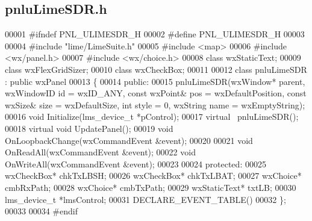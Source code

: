 \subsection{pnlu\+Lime\+S\+D\+R.\+h}
\label{pnluLimeSDR_8h_source}

\begin{DoxyCode}
00001 \textcolor{preprocessor}{#ifndef PNL\_ULIMESDR\_H}
00002 \textcolor{preprocessor}{#define PNL\_ULIMESDR\_H}
00003 
00004 \textcolor{preprocessor}{#include "lime/LimeSuite.h"}
00005 \textcolor{preprocessor}{#include <map>}
00006 \textcolor{preprocessor}{#include <wx/panel.h>}
00007 \textcolor{preprocessor}{#include <wx/choice.h>}
00008 \textcolor{keyword}{class }wxStaticText;
00009 \textcolor{keyword}{class }wxFlexGridSizer;
00010 \textcolor{keyword}{class }wxCheckBox;
00011 
00012 \textcolor{keyword}{class }pnluLimeSDR : \textcolor{keyword}{public} wxPanel
00013 \{
00014 \textcolor{keyword}{public}:
00015     pnluLimeSDR(wxWindow* parent, wxWindowID \textcolor{keywordtype}{id} = wxID\_ANY, \textcolor{keyword}{const} wxPoint& pos = wxDefaultPosition, \textcolor{keyword}{const} 
      wxSize& size = wxDefaultSize, \textcolor{keywordtype}{int} style = 0, wxString name = wxEmptyString);
00016     \textcolor{keywordtype}{void} Initialize(lms_device_t *pControl);
00017     \textcolor{keyword}{virtual} ~pnluLimeSDR();
00018     \textcolor{keyword}{virtual} \textcolor{keywordtype}{void} UpdatePanel();
00019     \textcolor{keywordtype}{void} OnLoopbackChange(wxCommandEvent &event);
00020 
00021     \textcolor{keywordtype}{void} OnReadAll(wxCommandEvent &event);
00022     \textcolor{keywordtype}{void} OnWriteAll(wxCommandEvent &event);
00023 
00024 \textcolor{keyword}{protected}:
00025     wxCheckBox* chkTxLBSH;
00026     wxCheckBox* chkTxLBAT;
00027     wxChoice* cmbRxPath;
00028     wxChoice* cmbTxPath;
00029     wxStaticText* txtLB;
00030     lms_device_t *lmsControl;
00031     DECLARE\_EVENT\_TABLE()
00032 \};
00033 
00034 \textcolor{preprocessor}{#endif}
\end{DoxyCode}
